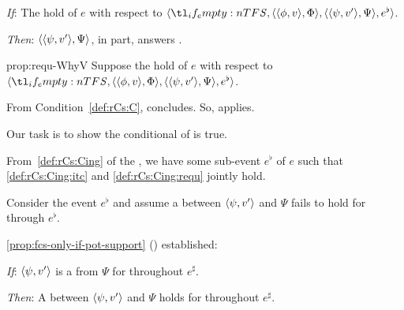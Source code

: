 \begin{note}
  \begin{proposition}
    \label{prop:requ-WhyV}
    \vspace{-\baselineskip}
    \begin{itenum}
    \item[\emph{If}:]
      The  hold of \(e\) with respect to \(\langle \vAgent{}, \pvp{\phi}{v}{\Phi}, \pvp{\psi}{v'}{\Psi}, e^{\flat} \rangle\).
    \item[\emph{Then}:]
      \(\langle \langle \psi, v' \rangle, \Psi \rangle\), in part, answers \qWhyV{}.
    \end{itenum}
    \vspace{-\baselineskip}
  \end{proposition}

  \begin{argument}{prop:requ-WhyV}
    Suppose the  hold of \(e\) with respect to \(\langle \vAgent{}, \pvp{\phi}{v}{\Phi}, \pvp{\psi}{v'}{\Psi}, e^{\flat} \rangle\).

    From Condition~\ref{def:rCs:C}, concludes.
    So, \qWhyV{} applies.

    Our task is to show the conditional of \qWhyV{} is true.

    From~\ref{def:rCs:Cing} of the \rCon{}, we have some sub-event \(e^{\flat}\) of \(e\) such that \ref{def:rCs:Cing:itc} and \ref{def:rCs:Cing:requ} jointly hold.

    Consider the event \(e^{\flat}\) and assume a \ros{} between \(\langle \psi, v' \rangle\) and \(\Psi\) fails to hold for \vAgent{} through \(e^{\flat}\).

    \autoref{prop:fcs-only-if-pot-support} () established:

    \begin{itenum}
    \item[\emph{If}:]
      \(\langle \psi, v' \rangle\) is a  from \(\Psi\) for \vAgent{} throughout \(e^{\sharp}\).
    \item[\emph{Then}:]
      A  between \(\langle \psi, v' \rangle\) and \(\Psi\) holds for \vAgent{} throughout \(e^{\sharp}\).
    \end{itenum}


\end{argument}
\end{note}
